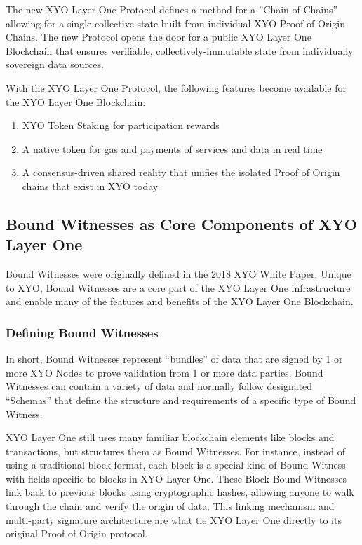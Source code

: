 \documentclass{article}
\begin{document}
The new XYO Layer One Protocol defines a method for a ”Chain of Chains” allowing for a single collective state built from individual XYO Proof of Origin Chains. The new Protocol opens the door for a public XYO Layer One Blockchain that ensures verifiable, collectively-immutable state from individually sovereign data sources. 

With the XYO Layer One Protocol, the following features become available for the XYO Layer One Blockchain: 

\begin{enumerate}
    \item XYO Token Staking for participation rewards 
    \item A native token for gas and payments of services and data in real time
    \item A consensus-driven shared reality that unifies the isolated Proof of Origin chains that exist in XYO today
\end{enumerate}

\subsection{Bound Witnesses as Core Components of XYO Layer One}
Bound Witnesses were originally defined in the 2018 XYO White Paper. Unique to XYO, Bound Witnesses are a core part of the XYO Layer One infrastructure and enable many of the features and benefits of the XYO Layer One Blockchain. 

\subsubsection{Defining Bound Witnesses}
In short, Bound Witnesses represent “bundles” of data that are signed by 1 or more XYO Nodes to prove validation from 1 or more data parties. Bound Witnesses can contain a variety of data and normally follow designated “Schemas” that define the structure and requirements of a specific type of Bound Witness. 

XYO Layer One still uses many familiar blockchain elements like blocks and transactions, but structures them as Bound Witnesses. For instance, instead of using a traditional block format, each block is a special kind of Bound Witness with fields specific to blocks in XYO Layer One. These Block Bound Witnesses link back to previous blocks using cryptographic hashes, allowing anyone to walk through the chain and verify the origin of data. This linking mechanism and multi-party signature architecture are what tie XYO Layer One directly to its original Proof of Origin protocol.
\end{document}
